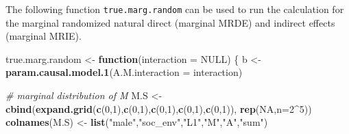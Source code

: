 \documentclass[
]{book}
\newenvironment{Shaded}{\begin{snugshade}}{\end{snugshade}}
\newcommand{\AttributeTok}[1]{\textcolor[rgb]{0.13,0.29,0.53}{#1}}
\newcommand{\CommentTok}[1]{\textcolor[rgb]{0.56,0.35,0.01}{\textit{#1}}}
\newcommand{\ConstantTok}[1]{\textcolor[rgb]{0.56,0.35,0.01}{#1}}
\newcommand{\ControlFlowTok}[1]{\textcolor[rgb]{0.13,0.29,0.53}{\textbf{#1}}}
\newcommand{\DecValTok}[1]{\textcolor[rgb]{0.00,0.00,0.81}{#1}}
\newcommand{\FunctionTok}[1]{\textcolor[rgb]{0.13,0.29,0.53}{\textbf{#1}}}
\newcommand{\NormalTok}[1]{#1}
\newcommand{\OtherTok}[1]{\textcolor[rgb]{0.56,0.35,0.01}{#1}}
\newcommand{\SpecialCharTok}[1]{\textcolor[rgb]{0.81,0.36,0.00}{\textbf{#1}}}
\newcommand{\StringTok}[1]{\textcolor[rgb]{0.31,0.60,0.02}{#1}}
\begin{document}
The following function \texttt{true.marg.random} can be used to run the calculation for the marginal randomized natural direct (marginal MRDE) and indirect effects (marginal MRIE).

\begin{Shaded}
\begin{Highlighting}[]
\NormalTok{true.marg.random }\OtherTok{\textless{}{-}} \ControlFlowTok{function}\NormalTok{(}\AttributeTok{interaction =} \ConstantTok{NULL}\NormalTok{) \{}
\NormalTok{  b }\OtherTok{\textless{}{-}} \FunctionTok{param.causal.model.1}\NormalTok{(}\AttributeTok{A.M.interaction =}\NormalTok{ interaction)}
  
  \CommentTok{\# marginal distribution of M}
\NormalTok{  M.S }\OtherTok{\textless{}{-}} \FunctionTok{cbind}\NormalTok{(}\FunctionTok{expand.grid}\NormalTok{(}\FunctionTok{c}\NormalTok{(}\DecValTok{0}\NormalTok{,}\DecValTok{1}\NormalTok{),}\FunctionTok{c}\NormalTok{(}\DecValTok{0}\NormalTok{,}\DecValTok{1}\NormalTok{),}\FunctionTok{c}\NormalTok{(}\DecValTok{0}\NormalTok{,}\DecValTok{1}\NormalTok{),}\FunctionTok{c}\NormalTok{(}\DecValTok{0}\NormalTok{,}\DecValTok{1}\NormalTok{),}\FunctionTok{c}\NormalTok{(}\DecValTok{0}\NormalTok{,}\DecValTok{1}\NormalTok{)), }\FunctionTok{rep}\NormalTok{(}\ConstantTok{NA}\NormalTok{,}\AttributeTok{n=}\DecValTok{2}\SpecialCharTok{\^{}}\DecValTok{5}\NormalTok{))}
  \FunctionTok{colnames}\NormalTok{(M.S) }\OtherTok{\textless{}{-}} \FunctionTok{list}\NormalTok{(}\StringTok{"male"}\NormalTok{,}\StringTok{"soc\_env"}\NormalTok{,}\StringTok{"L1"}\NormalTok{,}\StringTok{"M"}\NormalTok{,}\StringTok{"A"}\NormalTok{,}\StringTok{"sum"}\NormalTok{)}
  

\end{Highlighting}
\end{Shaded}
\end{document}
